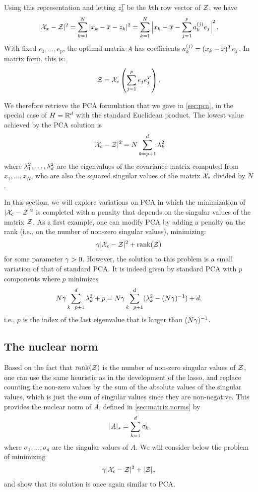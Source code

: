 Using this representation and letting $z_k^T$ be the $k$th row vector of ${\mathcal Z}$, we have
\[
|{\mathcal X}_x - {\mathcal Z}|^2 = \sum_{k=1}^N |x_k - \overline{x} -z_k|^2 = \sum_{k=1}^N \Big| x_k - \overline{x} - \sum_{j=1}^p a_{k}^{(j)} e_j\Big|^2\,.
\]
With fixed $e_1, \ldots, e_p$, the optimal matrix $A$ has coefficients $a_{k}^{(j)} = (x_k-\overline{x})^Te_j$. In matrix form, this is:
\[
{\mathcal Z} = {\mathcal X}_c \left(\sum_{j=1}^p e_je_j^T\right).
\]


We therefore retrieve the PCA formulation that we gave in  \cref{sec:pca}, in the special case of $H = {\mathbb{R}}^d$ with the standard Euclidean product.  The lowest value achieved by the PCA solution is 
\[
|{\mathcal X}_c - {\mathcal Z}|^2 = N\sum_{k=p+1}^d \lambda_k^2
\]
where $\lambda_1^2, \ldots, \lambda_d^2$ are the eigenvalues of the covariance matrix computed from $x_1, \ldots, x_N$, who are also the squared singular values of the matrix ${\mathcal X}_c$ divided by $N$.

In this section, we will explore variations on PCA in which the minimization of  $|{\mathcal X}_c - {\mathcal Z}|^2$ is completed with a penalty that depends on the singular values of the matrix ${\mathcal Z}$. As a first example, 
one can modify PCA by adding  a penalty on the rank (i.e., on the number of non-zero singular values), minimizing:
\[
{\gamma} |{\mathcal X}_c - {\mathcal Z}|^2+  \mathrm{rank}({\mathcal Z})
\]
for some parameter $\gamma>0$. However, the solution to this problem is a small variation of that of standard PCA. It is indeed given  by standard PCA with $p$ components where $p$ minimizes 
\[
N\gamma \sum_{k=p+1}^d \lambda_k^2 +  p = N\gamma \sum_{k=p+1}^d (\lambda_k^2 - (N\gamma)^{-1}) + d,
\]
i.e.,  $p$ is the index of the last eigenvalue that is larger than $(N\gamma)^{-1}$.

\subsection{The nuclear norm}
Based on the fact that $\mathrm{rank}({\mathcal Z})$ is the number of non-zero singular values of ${\mathcal Z}$, one can use the same heuristic as in the development of the lasso, and replace  counting the non-zero values by the sum of the absolute values of the singular values, which is just the sum of singular values since they  are non-negative. This provides the nuclear norm of $A$, defined in \cref{sec:matrix.norms} by
\[
|A|_* = \sum_{k=1}^d \sigma_k
\]
where $\sigma_1, \ldots, \sigma_d$ are the singular values of $A$.  We will consider below the problem of minimizing
\begin{equation}
\label{eq:robust.pca.2}
{\gamma} |{\mathcal X}_c - {\mathcal Z}|^2+  |{\mathcal Z}|_*
\end{equation}
and show that its solution is once again similar to PCA.

